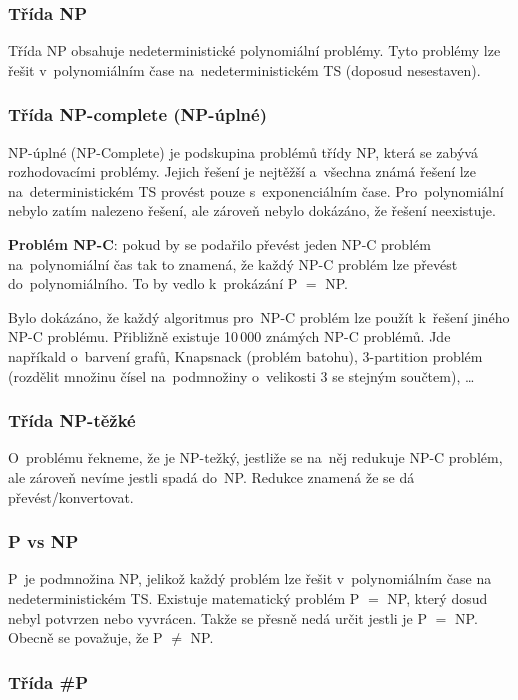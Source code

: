 \subsubsection{Třída NP}

Třída NP obsahuje nedeterministické polynomiální problémy.
Tyto problémy lze řešit v~polynomiálním čase na~nedeterministickém TS (doposud nesestaven).

\subsubsection{Třída NP-complete (NP-úplné)}

NP-úplné (NP-Complete) je podskupina problémů třídy NP, která se zabývá rozhodovacími problémy.
Jejich řešení je nejtěžší a~všechna známá řešení lze na~deterministickém TS provést pouze s~exponenciálním čase.
Pro~polynomiální nebylo zatím nalezeno řešení, ale zároveň nebylo dokázáno, že řešení neexistuje.

\textbf{Problém NP-C}: pokud by se podařilo převést jeden NP-C problém na~polynomiální čas tak to znamená, že každý NP-C problém lze převést do~polynomiálního.
To by vedlo k~prokázání P $=$ NP.

Bylo dokázáno, že každý algoritmus pro~NP-C problém lze použít k~řešení jiného \mbox{NP-C} problému.
Přibližně existuje 10\,000 známých NP-C problémů.
Jde napříkald o~barvení grafů, Knapsnack (problém batohu), 3-partition problém (rozdělit množinu čísel na~podmnožiny o~velikosti 3 se stejným součtem), \dots

\subsubsection{Třída NP-těžké}

O~problému řekneme, že je NP-težký, jestliže se na~něj redukuje NP-C problém, ale zároveň nevíme jestli spadá do~NP.
Redukce znamená že se dá převést/konvertovat.

\subsubsection{P vs NP}

P~je podmnožina NP, jelikož každý problém lze řešit v~polynomiálním čase na
nedeterministickém TS.
Existuje matematický problém P $=$ NP, který dosud nebyl potvrzen nebo vyvrácen. Takže se přesně nedá určit jestli je P $=$ NP.
Obecně se považuje, že P $\neq$ NP.

\subsubsection{Třída \#P}

